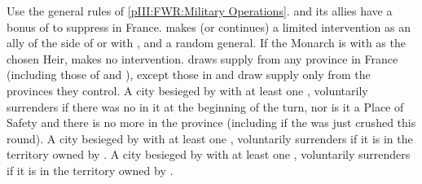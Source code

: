 \begin{digressions}



  \phmil
  \aparag Use the general rules of \ref{pIII:FWR:Military Operations}.
  \aparag \FRA and its allies have a bonus of  to suppress \REVOLT
  in France.
  \aparag \paysPalatinat makes (or continues) a limited intervention as an
  ally of the side of \leaderNavarre or  with
  \ARMY\faceplus, \LD and a random general. If the Monarch is  with  as the chosen Heir, \paysPalatinat makes no
  intervention.
  \aparag \FRA draws supply from any province in France (including those of
  \lig and \hug), except those in \REVOLT
  \aparag \lig and \hug draw supply only from the provinces they control.
  \bparag A city besieged by \FRA with at least one \ARMY \faceplus,
  voluntarily surrenders if there was no \REVOLT \faceplus in it at the
  beginning of the turn, nor is it a Place of Safety and there is no more
  \REVOLT in the province (including if the \REVOLT was just crushed this
  round).
  \bparag A city besieged by \lig with at least one \ARMY \faceplus,
  voluntarily surrenders if it is in the territory owned by \lig.
  \bparag A city besieged by \hug with at least one \ARMY \faceplus,
  voluntarily surrenders if it is in the territory owned by \hug.




\end{digressions}
